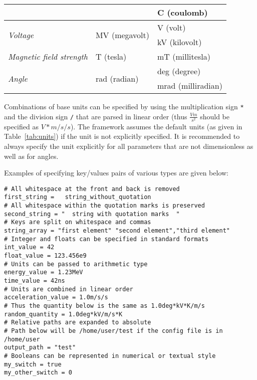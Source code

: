 \begin{table}[tbp]
\begin{tabular}{lll}
                                  &                                         & C (coulomb)              \\
\midrule
\multirow{2}{*}{\textit{Voltage}} & \multirow{2}{*}{MV (megavolt)}          & V (volt)                 \\
                                  &                                         & kV (kilovolt)            \\
\midrule
\textit{Magnetic field strength}  & T (tesla)                               & mT (millitesla)                 \\
\midrule
\multirow{2}{*}{\textit{Angle}}   & \multirow{2}{*}{rad (radian)}           & deg (degree)             \\
                                  &                                         & mrad (milliradian)       \\
\bottomrule
\end{tabular}
\end{table}

Combinations of base units can be specified by using the multiplication sign \texttt{*} and the division sign \texttt{/} that are parsed in linear order (thus $\frac{V m}{s^2}$ should be specified as $V*m/s/s$).
The framework assumes the default units (as given in Table~\ref{tab:units}) if the unit is not explicitly specified.
It is recommended to always specify the unit explicitly for all parameters that are not dimensionless as well as for angles.

Examples of specifying key/values pairs of various types are given below:
\begin{verbatim}
# All whitespace at the front and back is removed
first_string =   string_without_quotation
# All whitespace within the quotation marks is preserved
second_string = "  string with quotation marks  "
# Keys are split on whitespace and commas
string_array = "first element" "second element","third element"
# Integer and floats can be specified in standard formats
int_value = 42
float_value = 123.456e9
# Units can be passed to arithmetic type
energy_value = 1.23MeV
time_value = 42ns
# Units are combined in linear order
acceleration_value = 1.0m/s/s
# Thus the quantity below is the same as 1.0deg*kV*K/m/s
random_quantity = 1.0deg*kV/m/s*K
# Relative paths are expanded to absolute
# Path below will be /home/user/test if the config file is in /home/user
output_path = "test"
# Booleans can be represented in numerical or textual style
my_switch = true
my_other_switch = 0
\end{verbatim}

